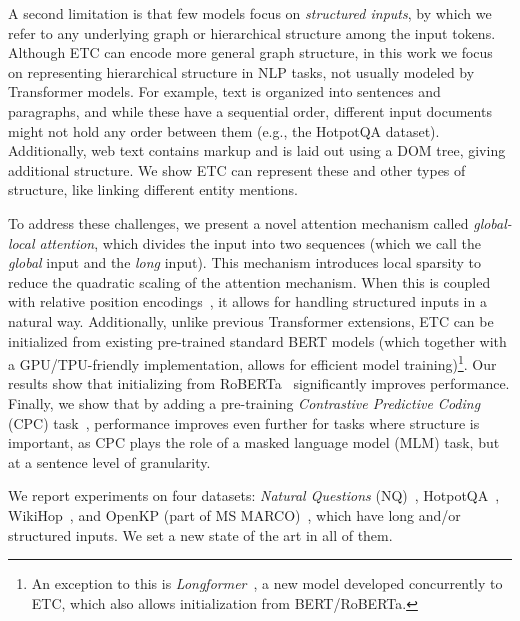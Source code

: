 \documentclass[11pt,a4paper]{article}
\begin{document}
A second limitation is that few models focus on {\em structured inputs}, by which we refer to any underlying graph or hierarchical structure among the input tokens. Although ETC can encode more general graph structure, in this work we focus on representing hierarchical structure in NLP tasks, not usually modeled by Transformer models. For example, text is organized into sentences and paragraphs, and while these have a sequential order, different input documents might not hold any order between them (e.g., the HotpotQA dataset). Additionally, web text contains markup and is laid out using a DOM tree, giving additional structure. We show ETC can represent these and other types of structure, like linking different entity mentions.







To address these challenges, we present a novel attention mechanism called {\em global-local attention}, which divides the input into two sequences (which we call the {\em global} input and the {\em long} input). This mechanism introduces local sparsity to reduce the quadratic scaling of the attention mechanism. When this is coupled with relative position encodings~\cite{shaw2018self}, it allows for handling structured inputs in a natural way. 
Additionally, unlike previous Transformer extensions, ETC can be initialized from existing pre-trained standard BERT models (which together with a GPU/TPU-friendly implementation, allows for efficient model training)\footnote{An exception to this is {\em Longformer}~\cite{beltagy2020longformer}, a new model developed concurrently to ETC, which also allows initialization from BERT/RoBERTa.}.  Our results show that initializing from RoBERTa~\cite{liu2019roberta} significantly improves performance. Finally, we show that by adding a pre-training {\em Contrastive Predictive Coding} (CPC) task~\cite{oord2018representation}, performance improves even further for tasks where structure is important, as CPC plays the role of a masked language model (MLM) task, but at a sentence level of granularity.



We report experiments on four datasets: {\em Natural Questions} (NQ)~\cite{kwiatkowski2019natural},  HotpotQA~\cite{yang2018hotpotqa}, WikiHop~\cite{welbl2018constructing}, and OpenKP (part of MS MARCO)~\cite{xiong2019open}, which have long and/or structured inputs. We set a new state of the art in all of them.
\end{document}
